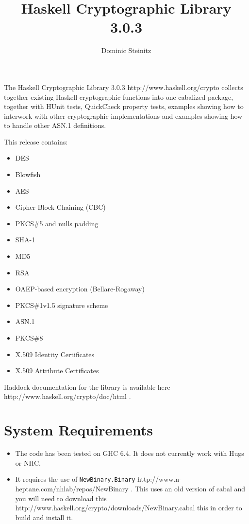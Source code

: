 \documentclass{article}
\title{Haskell Cryptographic Library 3.0.3}
\author{Dominic Steinitz}
\begin{document}
\maketitle

The 
\htmladdnormallinkfoot
{Haskell Cryptographic Library 3.0.3}
{http://www.haskell.org/crypto}
collects together existing Haskell cryptographic
functions into one cabalized package, together with HUnit tests,
QuickCheck property tests, examples showing how to interwork with
other cryptographic implementations and examples showing how to 
handle other ASN.1 definitions.

This release contains:
\begin{itemize}
\item DES
\item Blowfish
\item AES
\item Cipher Block Chaining (CBC)
\item PKCS\#5 and nulls padding
\item SHA-1
\item MD5
\item RSA
\item OAEP-based encryption (Bellare-Rogaway)
\item PKCS\#1v1.5 signature scheme
\item ASN.1
\item PKCS\#8
\item X.509 Identity Certificates
\item X.509 Attribute Certificates
\end{itemize}

Haddock documentation for the library is available
\htmladdnormallinkfoot
{here}
{http://www.haskell.org/crypto/doc/html}
.

\section{System Requirements}

\begin{itemize}
\item
The code has been tested on GHC 6.4.
It does not currently work with Hugs or NHC. 
\item
It requires the use of
\htmladdnormallinkfoot
{{\tt NewBinary.Binary}}
{http://www.n-heptane.com/nhlab/repos/NewBinary}
.
This uses an old version of cabal and you will need to download 
\htmladdnormallinkfoot
{this}
{http://www.haskell.org/crypto/downloads/NewBinary.cabal}
this
in order to build and install it.
\end{itemize}
\end{document}
